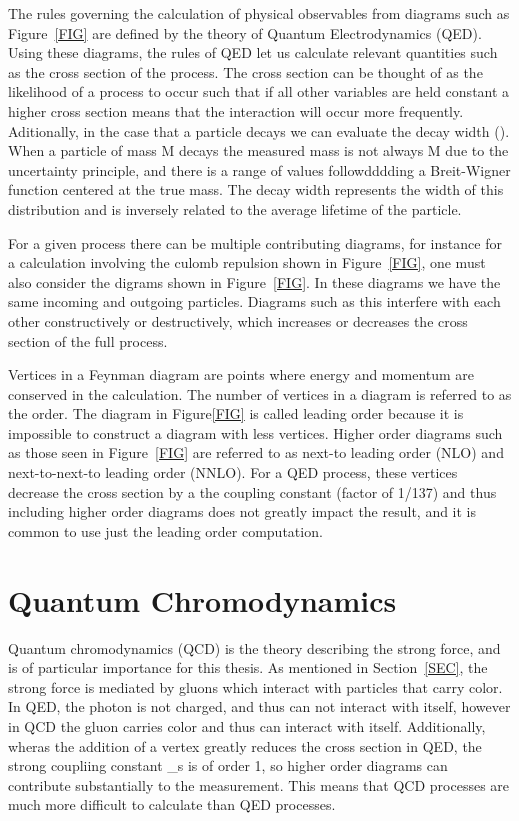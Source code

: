 The rules governing the calculation of physical observables from diagrams such as Figure~\ref{FIG} are defined by the theory of Quantum Electrodynamics (QED).
Using these diagrams, the rules of QED let us calculate relevant quantities such as the cross section of the process.  
The cross section can be thought of as the likelihood of a process to occur such that if all other variables are held constant 
a higher cross section means that the interaction will occur more frequently.  
Aditionally, in the case that a particle decays we can evaluate the decay width (\Gamma).  
When a particle of mass M decays the measured mass is not always M due to the uncertainty principle, and there is a range of values followdddding a Breit-Wigner function centered at the true mass.
The decay width represents the width of this distribution and is inversely related to the average lifetime of the particle.

For a given process there can be multiple contributing diagrams, for instance for a calculation involving the culomb repulsion shown in Figure~\ref{FIG}, one must also consider the 
digrams shown in Figure~\ref{FIG}.  In these diagrams we have the same incoming and outgoing particles.  
Diagrams such as this interfere with each other constructively or destructively, which increases or decreases the cross section of the full process.

Vertices in a Feynman diagram are points where energy and momentum are conserved in the calculation.  The number of vertices in a diagram is referred to as the order.  
The diagram in Figure\ref{FIG} is called leading order because it is impossible to construct a diagram with less vertices.  
Higher order diagrams such as those seen in Figure~\ref{FIG} are referred to as next-to leading order (NLO) and next-to-next-to leading order (NNLO).  
For a QED process, these vertices decrease the cross section by a the coupling constant \alpha (factor of 1/137) and thus including higher order 
diagrams does not greatly impact the result, and it is common to use just the leading order computation. 

\section{Quantum Chromodynamics}
Quantum chromodynamics (QCD) is the theory describing the strong force, and is of particular importance for this thesis.  
As mentioned in Section~\ref{SEC}, the strong force is mediated by gluons which interact with particles that carry color.  
In QED, the photon is not charged, and thus can not interact with itself, however in QCD the gluon carries color and thus can interact with itself.  
Additionally, wheras the addition of a vertex greatly reduces the cross section in QED, the strong coupliing constant \alpha_s is of order 1, so 
higher order diagrams can contribute substantially to the measurement.  This means that QCD processes are much more difficult to calculate than QED 
processes.


